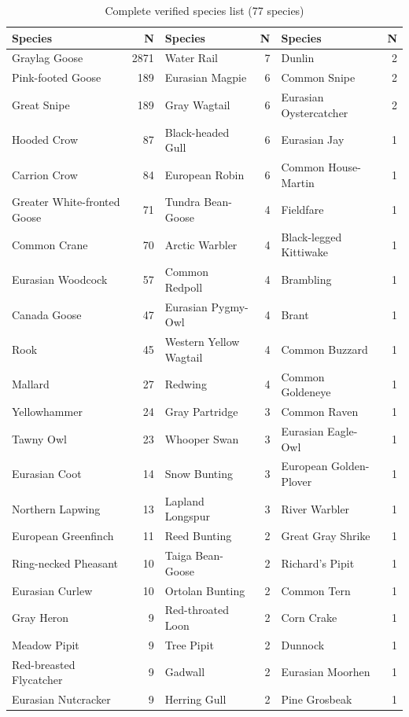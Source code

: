 \documentclass[twocolumn]{article}
\begin{document}
\begin{table}[H]
\centering
\caption{Complete verified species list (77 species)}
\label{tab:species_full}
\tiny
\begin{tabular}{lr|lr|lr}
\toprule
\textbf{Species} & \textbf{N} & \textbf{Species} & \textbf{N} & \textbf{Species} & \textbf{N} \\
\midrule
Graylag Goose & 2871 & Water Rail & 7 & Dunlin & 2 \\
Pink-footed Goose & 189 & Eurasian Magpie & 6 & Common Snipe & 2 \\
Great Snipe & 189 & Gray Wagtail & 6 & Eurasian Oystercatcher & 2 \\
Hooded Crow & 87 & Black-headed Gull & 6 & Eurasian Jay & 1 \\
Carrion Crow & 84 & European Robin & 6 & Common House-Martin & 1 \\
Greater White-fronted Goose & 71 & Tundra Bean-Goose & 4 & Fieldfare & 1 \\
Common Crane & 70 & Arctic Warbler & 4 & Black-legged Kittiwake & 1 \\
Eurasian Woodcock & 57 & Common Redpoll & 4 & Brambling & 1 \\
Canada Goose & 47 & Eurasian Pygmy-Owl & 4 & Brant & 1 \\
Rook & 45 & Western Yellow Wagtail & 4 & Common Buzzard & 1 \\
Mallard & 27 & Redwing & 4 & Common Goldeneye & 1 \\
Yellowhammer & 24 & Gray Partridge & 3 & Common Raven & 1 \\
Tawny Owl & 23 & Whooper Swan & 3 & Eurasian Eagle-Owl & 1 \\
Eurasian Coot & 14 & Snow Bunting & 3 & European Golden-Plover & 1 \\
Northern Lapwing & 13 & Lapland Longspur & 3 & River Warbler & 1 \\
European Greenfinch & 11 & Reed Bunting & 2 & Great Gray Shrike & 1 \\
Ring-necked Pheasant & 10 & Taiga Bean-Goose & 2 & Richard's Pipit & 1 \\
Eurasian Curlew & 10 & Ortolan Bunting & 2 & Common Tern & 1 \\
Gray Heron & 9 & Red-throated Loon & 2 & Corn Crake & 1 \\
Meadow Pipit & 9 & Tree Pipit & 2 & Dunnock & 1 \\
Red-breasted Flycatcher & 9 & Gadwall & 2 & Eurasian Moorhen & 1 \\
Eurasian Nutcracker & 9 & Herring Gull & 2 & Pine Grosbeak & 1 \\

\end{tabular}
\end{table}
\end{document}
